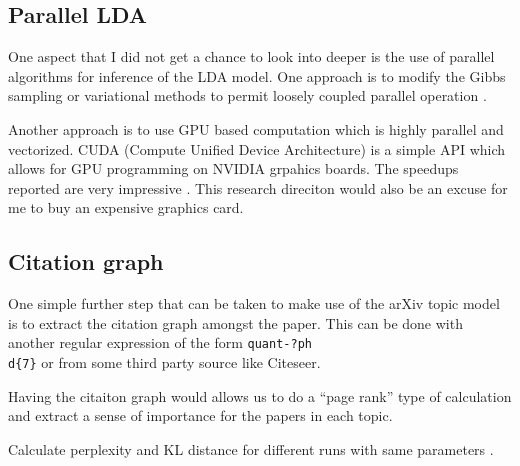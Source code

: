\documentclass[11pt]{article}
\begin{document}
	\subsection{Parallel LDA}

        One aspect that I did not get a chance to look into deeper is the use of parallel algorithms
        for inference of the LDA model.
        One approach is to modify the Gibbs sampling or variational methods to permit loosely
        coupled parallel operation \cite{newman2006scalable,newman2007distributed}. 

        Another approach is to use GPU based computation which is highly parallel and vectorized.
        CUDA (Compute Unified Device Architecture) is a simple API which allows for GPU programming
        on NVIDIA grpahics boards. The speedups reported are very impressive
        \cite{masada2009accelerating, yan-parallel}.
        This research direciton would also be an excuse for me to buy an expensive graphics card.

			
    \subsection{Citation graph}

        One simple further step that can be taken to make use of the arXiv topic model 
        is to extract the citation graph amongst the paper. This can be done with another
        regular expression of the form \texttt{quant-?ph\\d\{7\}} or from some third party
        source like Citeseer.
        
        Having the citaiton graph would allows us to do a ``page rank'' type of calculation
        and extract a sense of importance for the papers in each topic.




    Calculate perplexity and KL distance for different runs with same parameters
    \cite{newman2006scalable}.






\end{document}
